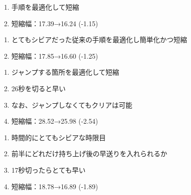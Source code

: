 \begin{enumerate}[label={\sarrow}]
\item 手順を最適化して短縮
\item 短縮幅：17.39→16.24 (-1.15)
\end{enumerate}



\begin{enumerate}[label={\sarrow}]
\item とてもシビアだった従来の手順を最適化し簡単化かつ短縮
\item 短縮幅：17.85→16.60 (-1.25)
\end{enumerate}



\begin{enumerate}[label={\sarrow}]
\item ジャンプする箇所を最適化して短縮
\item 26秒を切ると早い
\item なお、ジャンプしなくてもクリアは可能
\item 短縮幅：28.52→25.98 (-2.54)
\end{enumerate}



\clearpage
\begin{enumerate}[label={\sarrow}]
\item 時間的にとてもシビアな時限目
\item 前半にどれだけ持ち上げ後の早送りを入れられるか
\item 17秒切ったらとても早い
\item 短縮幅：18.78→16.89 (-1.89)
\end{enumerate}



